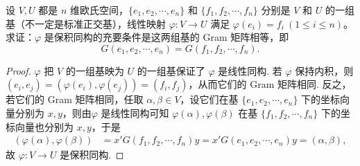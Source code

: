 \documentclass[../../main.tex]{subfiles}%
\begin{document}
\begin{proposition}\label{proposition:例9.35}
设 \(V,U\) 都是 \(n\) 维欧氏空间，\(\{e_1,e_2,\cdots,e_n\}\) 和 \(\{f_1,f_2,\cdots,f_n\}\) 分别是 \(V\) 和 \(U\) 的一组基（不一定是标准正交基），线性映射 \(\varphi:V\rightarrow U\) 满足 \(\varphi(e_i)=f_i\ (1\leqslant  i\leqslant  n)\)。求证：\(\varphi\) 是保积同构的充要条件是这两组基的 Gram 矩阵相等，即
\[
G(e_1,e_2,\cdots,e_n)=G(f_1,f_2,\cdots,f_n).
\]
\end{proposition}
\begin{proof}
\(\varphi\) 把 \(V\) 的一组基映为 \(U\) 的一组基保证了 \(\varphi\) 是线性同构. 若 \(\varphi\) 保持内积，则 \((e_i,e_j)=(\varphi(e_i),\varphi(e_j))=(f_i,f_j)\)，从而它们的 Gram 矩阵相同. 反之，若它们的 Gram 矩阵相同，任取 \(\alpha,\beta\in V\)，设它们在基 \(\{e_1,e_2,\cdots,e_n\}\) 下的坐标向量分别为 \(x,y\)，则由\(\varphi\) 是线性同构可知 \(\varphi(\alpha),\varphi(\beta)\) 在基 \(\{f_1,f_2,\cdots,f_n\}\) 下的坐标向量也分别为 \(x,y\)，于是
\begin{align*}
(\varphi(\alpha),\varphi(\beta))&=x'G(f_1,f_2,\cdots,f_n)y=x'G(e_1,e_2,\cdots,e_n)y=(\alpha,\beta),
\end{align*}
故 \(\varphi:V\rightarrow U\) 是保积同构. 
\end{proof}
\end{document}
